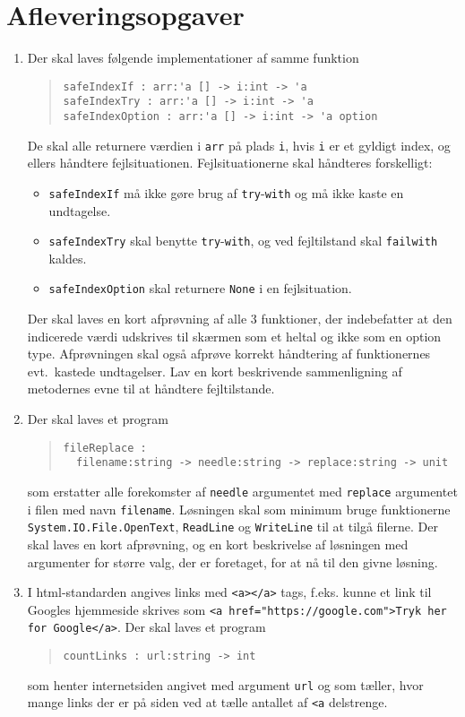 \documentclass[a4paper,12pt]{article}
\begin{document}
\section*{Afleveringsopgaver}
\begin{enumerate}[label=9i.\arabic*,start=0]
\item Der skal laves følgende implementationer af samme funktion
  \begin{quote}
    \mbox{\lstinline!safeIndexIf : arr:'a [] -> i:int -> 'a!}
    \\\mbox{\lstinline!safeIndexTry : arr:'a [] -> i:int -> 'a!}
    \\\mbox{\lstinline!safeIndexOption : arr:'a [] -> i:int -> 'a option!}
  \end{quote}
  De skal alle returnere værdien i \lstinline!arr! på plads \lstinline!i!, hvis \lstinline!i! er et gyldigt index, og ellers håndtere fejlsituationen.  Fejlsituationerne skal håndteres forskelligt:
  \begin{itemize}
  \item \lstinline!safeIndexIf! må ikke gøre brug af \lstinline!try!-\lstinline!with! og må ikke kaste en undtagelse. 
  \item \lstinline!safeIndexTry! skal benytte \lstinline!try!-\lstinline!with!, og ved fejltilstand skal \lstinline!failwith! kaldes. 
  \item \lstinline!safeIndexOption! skal returnere \lstinline!None! i en fejlsituation. 
  \end{itemize}
   Der skal laves en kort afprøvning af alle 3 funktioner, der indebefatter at den indicerede værdi udskrives til skærmen som et heltal og ikke som en option type. Afprøvningen skal også afprøve korrekt håndtering af funktionernes evt.\ kastede undtagelser.  Lav en kort beskrivende sammenligning af metodernes evne til at håndtere fejltilstande.
 \item Der skal laves et program
  \begin{quote}
    \lstinline!fileReplace :!
    \\\noindent\lstinline!  filename:string -> needle:string -> replace:string -> unit!
  \end{quote}
  som erstatter alle forekomster af \lstinline!needle! argumentet med \lstinline!replace! argumentet i filen med navn \lstinline!filename!. Løsningen skal som minimum bruge funktionerne \lstinline{System.IO.File.OpenText}, \lstinline{ReadLine} og \lstinline{WriteLine} til at tilgå filerne. Der skal laves en kort afprøvning, og en kort beskrivelse af løsningen med argumenter for større valg, der er foretaget, for at nå til den givne løsning.
\item I html-standarden angives links med \lstinline!<a></a>! tags, f.eks. kunne et link til Googles hjemmeside skrives som \lstinline!<a href="https://google.com">Tryk her for Google</a>!. Der skal laves et program
  \begin{quote}
    \mbox{\lstinline!countLinks : url:string -> int!}
  \end{quote}
  som henter internetsiden angivet med argument \lstinline!url! og som tæller, hvor mange links der er på siden ved at tælle antallet af \lstinline!<a! delstrenge.


\end{enumerate}
\end{document}
